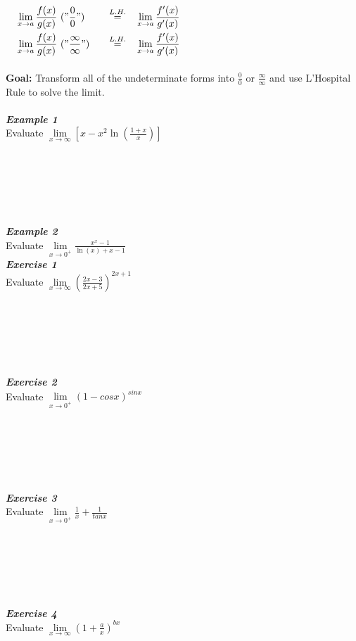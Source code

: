 \documentclass[12px]{article}
\begin{document}
\begin{enumerate}
    $\quad
    \begin{aligned}
        &\lim\limits_{x\to a}\frac{f(x)}{g(x)}\ ("\frac{0}{0}")\quad&\overset{L.H.}{=}\quad&\lim\limits_{x\to a}\frac{f'(x)}{g'(x)}\\
        &\lim\limits_{x\to a}\frac{f(x)}{g(x)}\ ("\frac{\infty}{\infty}")\quad&\overset{L.H.}{=}\quad&\lim\limits_{x\to a}\frac{f'(x)}{g'(x)}
    \end{aligned}$\\
    \\
    \textbf{Goal:} Transform all of the undeterminate forms into $\frac{0}{0}$ or $\frac{\infty}{\infty}$ and use L'Hospital Rule to solve the limit.\\
    \\
    \textbf{\textit{Example 1}}\\
    Evaluate $\lim\limits_{x\to\infty}[x-x^2\ln{(\frac{1+x}{x})}]$\\
    \\
    \\
    \\
    \\
    \\
    \\
    \textbf{\textit{Example 2}}\\
    Evaluate $\lim\limits_{x\to0^+}\frac{x^x-1}{\ln(x)+x-1}$\\
    \newpage
    \textbf{\textit{Exercise 1}}\\
    Evaluate $\lim\limits_{x\to\infty}(\frac{2x-3}{2x+5})^{2x+1}$\\
    \\
    \\
    \\
    \\
    \\
    \\
    \textbf{\textit{Exercise 2}}\\
    Evaluate $\lim\limits_{x\to0^+}(1-cosx)^{sinx}$\\
    \\
    \\
    \\
    \\
    \\
    \\
    \textbf{\textit{Exercise 3}}\\
    Evaluate $\lim\limits_{x\to0^+}\frac{1}{x}+\frac{1}{tanx}$\\
    \\
    \\
    \\
    \\
    \\
    \\
    \textbf{\textit{Exercise 4}}\\
    Evaluate $\lim\limits_{x\to\infty}(1+\frac{a}{x})^{bx}$


\end{enumerate}
\end{document}
